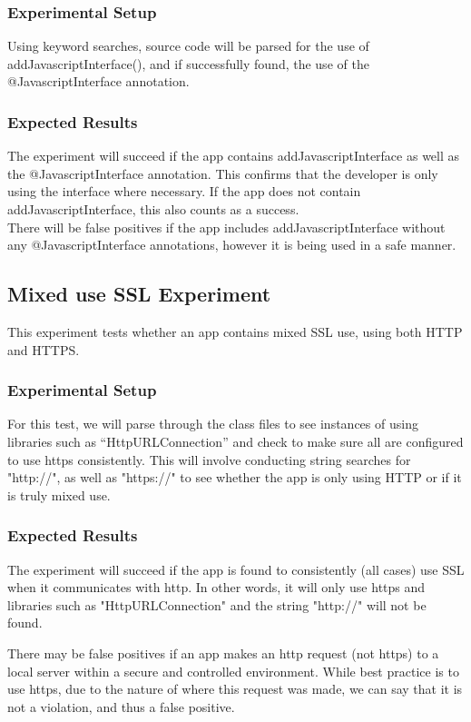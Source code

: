 \documentclass[10pt,twocolumn,pdftex]{article}
\begin{document}
    \subsubsection{Experimental Setup}
        Using keyword searches, source code will be parsed for the use of addJavascriptInterface(), and if successfully found, the use of the @JavascriptInterface annotation.

    \subsubsection{Expected Results}
        The experiment will succeed if the app contains addJavascriptInterface as well as the @JavascriptInterface annotation. This confirms that the developer is only using the interface where necessary. If the app does not contain addJavascriptInterface, this also counts as a success. \\
        There will be false positives if the app includes addJavascriptInterface without any @JavascriptInterface annotations, however it is being used in a safe manner.


\subsection{Mixed use SSL Experiment}
    This experiment tests whether an app contains mixed SSL use, using both HTTP and HTTPS. 
    
    \subsubsection{Experimental Setup}
    For this test, we will parse through the class files to see instances of using libraries such as “HttpURLConnection” and check to make sure all are configured to use https consistently. This will involve conducting string searches for "http://", as well as "https://" to see whether the app is only using HTTP or if it is truly mixed use. 
    
    \subsubsection{Expected Results}
    The experiment will succeed if the app is found to consistently (all cases) use SSL when it communicates with http. In other words, it will only use https and libraries such as "HttpURLConnection" and the string "http://" will not be found. 
    
    There may be false positives if an app makes an http request (not https) to a local server within a secure and controlled environment. While best practice is to use https, due to the nature of where this request was made, we can say that it is not a violation, and thus a false positive.
    
\end{document}
